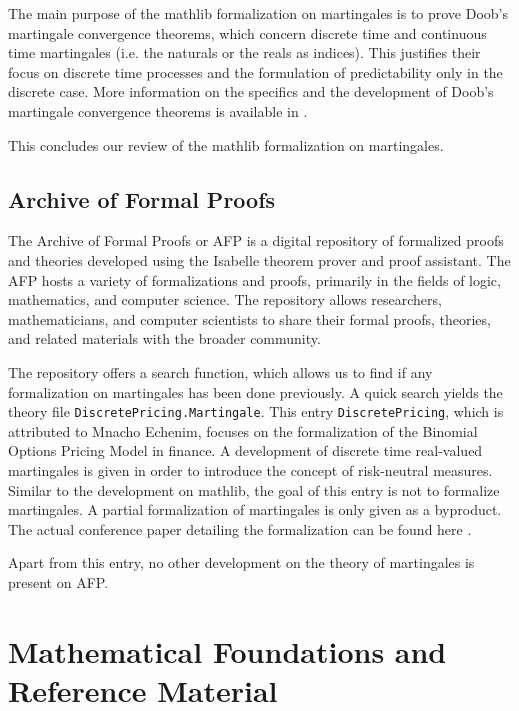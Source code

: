 The main purpose of the \textsf{mathlib} formalization on martingales is to prove Doob's martingale convergence theorems, which concern discrete time and continuous time martingales (i.e. the naturals or the reals as indices). This justifies their focus on discrete time processes and the formulation of predictability only in the discrete case. More information on the specifics and the development of Doob's martingale convergence theorems is available in \cite{ying2022formalization}.

This concludes our review of the \textsf{mathlib} formalization on martingales.

\subsection{Archive of Formal Proofs}

The \textsf{Archive of Formal Proofs} or \textsf{\ac{AFP}} is a digital repository of formalized proofs and theories developed using the Isabelle theorem prover and proof assistant. The \textsf{\ac{AFP}}  hosts a variety of formalizations and proofs, primarily in the fields of logic, mathematics, and computer science. The repository allows researchers, mathematicians, and computer scientists to share their formal proofs, theories, and related materials with the broader community.

The repository offers a search function, which allows us to find if any formalization on martingales has been done previously. A quick search yields the theory file \texttt{DiscretePricing.Martingale}. This entry \texttt{DiscretePricing}, which is attributed to Mnacho Echenim, focuses on the formalization of the Binomial Options Pricing Model in finance. A development of discrete time real-valued martingales is given in order to introduce the concept of risk-neutral measures. Similar to the development on \textsf{mathlib}, the goal of this entry is not to formalize martingales. A partial formalization of martingales is only given as a byproduct. The actual conference paper detailing the formalization can be found here \cite{EchenimPeltier}.

Apart from this entry, no other development on the theory of martingales is present on \textsf{\ac{AFP}}.

\section{Mathematical Foundations and Reference Material}

